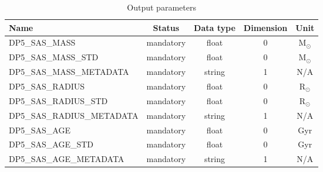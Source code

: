 \documentclass[a4paper, oneside, 11pt, article, english]{memoir}
\begin{document}
\iffalse
{
  \itshape
  A comprehensive list of outputs must be provided in the table. For each output,
  the following information is needed

  \begin{description}
    \firmlist
  \item[Name] the name must follow the nomenclature as defined by WP120 Data
    Products Definition Document [RD3].
  \item[Status] specify if this data is \emph{mandatory} or \emph{optional} to run the algorithm.
  \item[Data type] see \cref{sec:nomenclature} for the standard definitions
  \item[Dimension] specify the dimension of the data (e.g; the dimension of a scalar is 0, of an array 1, etc).
  \item[Unit] provide the unit of the data and the data-system of units (cgs or mks).
  \end{description}
}
\fi

\begin{table}[htbp]
  \centering
  \caption{Output parameters}
  \label{tab:output}
  \begin{tabular}{lcccc}
    \toprule
    Name & Status & Data type & Dimension & Unit \\
    \midrule
    DP5\_SAS\_MASS & mandatory & float & 0 & M$_\odot$ \\
    DP5\_SAS\_MASS\_STD & mandatory & float & 0 & M$_\odot$ \\
    DP5\_SAS\_MASS\_METADATA & mandatory & string & 1 & N/A \\
    DP5\_SAS\_RADIUS & mandatory & float & 0 & R$_\odot$ \\
    DP5\_SAS\_RADIUS\_STD & mandatory & float & 0 & R$_\odot$ \\
    DP5\_SAS\_RADIUS\_METADATA & mandatory & string & 1 & N/A \\
    DP5\_SAS\_AGE & mandatory & float & 0 & Gyr \\
    DP5\_SAS\_AGE\_STD & mandatory & float & 0 & Gyr \\
    DP5\_SAS\_AGE\_METADATA & mandatory & string & 1 & N/A \\
    \bottomrule
  \end{tabular}
\end{table}


\clearpage
\end{document}

